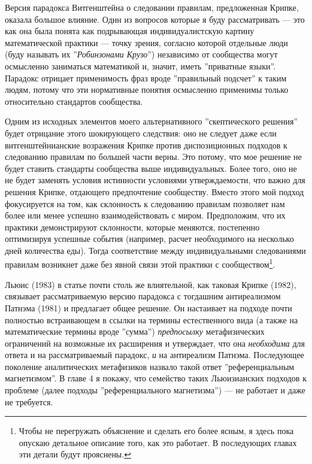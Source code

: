 \documentclass[11pt]{book}
\begin{document}
Версия парадокса Витгенштейна о следовании правилам, предложенная Крипке, оказала большое влияние. Один из вопросов которые я буду рассматривать --- это как она была понята как подрывающая индивидуалистскую картину математической практики --- точку зрения, согласно которой отдельные люди (буду называть их ''\textit{Робинзонами Крузо}'') независимо от сообщества могут осмысленно заниматься математикой и, значит, иметь ''приватные языки''. Парадокс отрицает применимость фраз вроде ''правильный подсчет'' к таким людям, потому что эти нормативные понятия осмысленно применимы только относительно стандартов сообщества.

Одним из исходных элементов моего альтернативного ''скептического решения'' будет отрицание этого шокирующего следствия: оно не следует даже если витгенштейнианские возражения Крипке против диспозиционных подходов к следованию правилам по большей части верны. Это потому, что мое решение не будет ставить стандарты сообщества выше индивидуальных. Более того, оно не не будет заменять условия истинности условиями утверждаемости, что важно для решения Крипке, отдающего предпочтение сообществу. Вместо этого мой подход фокусируется на том, как склонность к следованию правилам позволяет нам более или менее успешно взаимодействовать с миром. Предположим, что их практики демонстрируют склонности, которые меняются, постепенно оптимизируя успешные события (например, расчет необходимого на несколько дней количества еды). Тогда соответствие между индивидуальными следованиями правилам возникнет даже без явной связи этой практики с сообществом\footnote{Чтобы не перегружать объяснение и сделать его более ясным, я здесь пока опускаю детальное описание того, как это работает. В последующих главах эти детали будут прояснены.}.

Льюис (1983) в статье почти столь же влиятельной, как таковая Крипке (1982), связывает рассматриваемую версию парадокса с тогдашним антиреализмом Патнэма (1981) и предлагает общее решение. Он настаивает на подходе почти полностью встраивающем в ссылки на термины естественного вида (а также на математические термины вроде ''сумма'') \textit{предпосылку} метафизических ограничений на возможные их расширения и утверждает, что она \textit{необходима} для ответа и на рассматриваемый парадокс, \textit{и} на антиреализм Патнэма. Последующее поколение аналитических метафизиков назвало такой ответ ''референциальным магнетизмом''. В главе 4 я покажу, что семейство таких Льюизианских подходов к проблеме (далее подходы ''референциального магнетизма'') --- не работает и даже не требуется.
\end{document}
